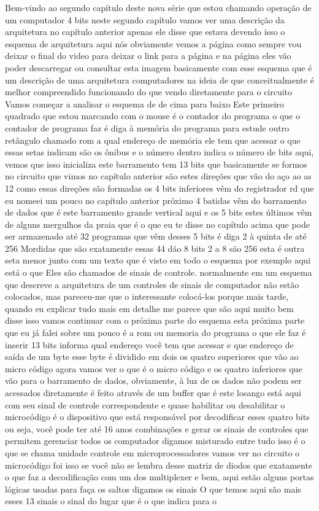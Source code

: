 \documentclass[oneside,11pt]{memoir} %
\begin{document}
Bem-vindo ao segundo capítulo deste  nova série que estou chamando  operação de um computador 4  bits neste segundo capítulo vamos  ver uma descrição da arquitetura  no capítulo anterior apenas  ele disse que estava devendo isso  o esquema de arquitetura aqui  nós obviamente vemos a página como sempre  vou deixar o final do video para deixar o  link para a página e na página eles vão  poder descarregar ou consultar esta imagem  basicamente com esse esquema que é um  descrição de uma arquitetura  computadores na ideia de que  conceitualmente é melhor compreendido  funcionando do que vendo diretamente  para o circuito  Vamos começar a analisar o esquema de  de cima para baixo  Este primeiro quadrado que estou marcando  com o mouse é o contador do programa  o que o contador de programa faz é  diga à memória do programa para  estude outro retângulo chamado rom a  qual endereço de memória ele tem que  acessar  o que essas setas indicam são os  ônibus e o número dentro indica  o número de bits aqui, vemos que isso  inicializa este barramento tem 13 bits que  basicamente se formos no circuito que  vimos no capítulo anterior são estes  direções que vão do aço ao  as 12  como essas direções são formadas os 4  bits inferiores vêm do registrador  rd que eu nomeei um pouco no capítulo  anterior próximo 4 batidas vêm  do barramento de dados que é este barramento  grande vertical aqui e os 5 bits  estes últimos vêm de alguns mergulhos da praia que é  o que eu te disse no capítulo  acima que pode ser armazenado até 32  programas que vêm desses 5 bits é  diga 2 à quinta de até 256  Mordidas que são exatamente essas 44 dão 8  bits 2 a 8 são 256  esta é outra seta menor junto  com um texto que é visto em todo o  esquema por exemplo aqui está o que  Eles são chamados de sinais de controle.  normalmente em um esquema que  descreve a arquitetura de um  controles de sinais de computador não  estão colocados, mas pareceu-me que o  interessante colocá-los porque  mais tarde, quando eu explicar tudo mais em  detalhe me parece que são  aqui muito bem disse isso vamos continuar com o  próxima parte do esquema  esta próxima parte que eu já falei sobre um  pouco é a rom ou memoria do programa  o que ele faz é inserir 13 bits informa  qual endereço você tem que acessar e que  endereço de saída de um byte  esse byte é dividido em dois  os quatro superiores que vão ao micro  código agora vamos ver o que é o micro  código e os quatro inferiores que vão  para o barramento de dados, obviamente, à luz de  os dados não podem ser acessados diretamente é feito através de um buffer que é  este losango está aqui com seu sinal de  controle correspondente e quase  habilitar ou desabilitar  o microcódigo é o dispositivo que está  responsável por decodificar esses quatro bits  ou seja, você pode ter até 16 anos  combinações e gerar os sinais de  controles que permitem gerenciar todos os  computador digamos misturado entre  tudo isso é o que se chama unidade  controle em microprocessadores  vamos ver no circuito o microcódigo  foi isso se você não se lembra desse  matriz de diodos que exatamente o que  faz a decodificação com um dos  multiplexer e bem, aqui estão alguns  portas lógicas usadas para  faça os saltos digamos os sinais  O que temos aqui são mais esses 13 sinais  o sinal do lugar que é o que indica  para o 
\end{document}
